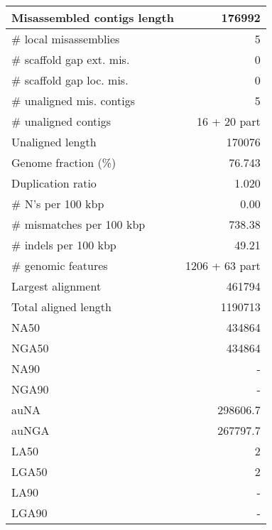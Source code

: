 \documentclass[12pt,a4paper]{article}
\begin{document}
\begin{table}[ht]
\begin{center}
\begin{tabular}{|l*{1}{|r}|}
Misassembled contigs length & 176992 \\ \hline
\# local misassemblies & 5 \\ \hline
\# scaffold gap ext. mis. & 0 \\ \hline
\# scaffold gap loc. mis. & 0 \\ \hline
\# unaligned mis. contigs & 5 \\ \hline
\# unaligned contigs & 16 + 20 part \\ \hline
Unaligned length & 170076 \\ \hline
Genome fraction (\%) & 76.743 \\ \hline
Duplication ratio & 1.020 \\ \hline
\# N's per 100 kbp & 0.00 \\ \hline
\# mismatches per 100 kbp & 738.38 \\ \hline
\# indels per 100 kbp & 49.21 \\ \hline
\# genomic features & 1206 + 63 part \\ \hline
Largest alignment & 461794 \\ \hline
Total aligned length & 1190713 \\ \hline
NA50 & 434864 \\ \hline
NGA50 & 434864 \\ \hline
NA90 & - \\ \hline
NGA90 & - \\ \hline
auNA & 298606.7 \\ \hline
auNGA & 267797.7 \\ \hline
LA50 & 2 \\ \hline
LGA50 & 2 \\ \hline
LA90 & - \\ \hline
LGA90 & - \\ \hline
\end{tabular}
\end{center}
\end{table}
\end{document}
